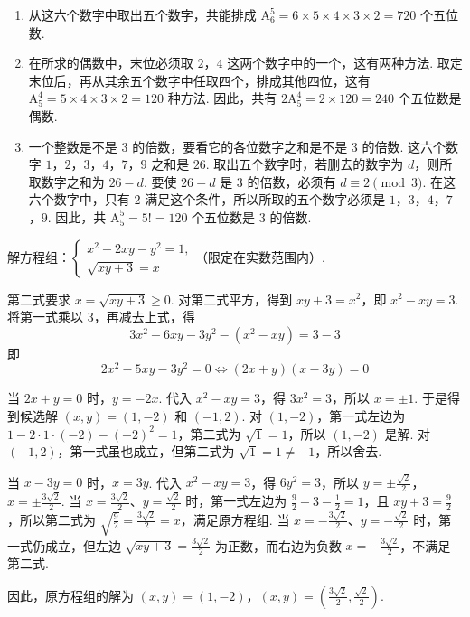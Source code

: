 \begin{solution}
\begin{enumerate}
\item 从这六个数字中取出五个数字，共能排成 \(\mathrm A_6^5=6\times5\times4\times3\times2=720\) 个五位数.

\item 在所求的偶数中，末位必须取 \(2\)，\(4\) 这两个数字中的一个，这有两种方法. 取定末位后，再从其余五个数字中任取四个，排成其他四位，这有 \(\mathrm A_5^4=5\times4\times3\times2=120\) 种方法. 因此，共有 \(2\mathrm A_5^4=2\times120=240\) 个五位数是偶数.

\item 一个整数是不是 \(3\) 的倍数，要看它的各位数字之和是不是 \(3\) 的倍数. 这六个数字 \(1\)，\(2\)，\(3\)，\(4\)，\(7\)，\(9\) 之和是 \(26\). 取出五个数字时，若删去的数字为 \(d\)，则所取数字之和为 \(26-d\). 要使 \(26-d\) 是 \(3\) 的倍数，必须有 \(d\equiv2\pmod3\). 在这六个数字中，只有 \(2\) 满足这个条件，所以所取的五个数字必须是 \(1\)，\(3\)，\(4\)，\(7\)，\(9\). 因此，共 \(\mathrm A_5^5=5!=120\) 个五位数是 \(3\) 的倍数.
\end{enumerate}
\end{solution}

\begin{problem}
解方程组：\(\begin{cases}
x^2-2xy-y^2=1,\\
\sqrt{xy+3}=x
\end{cases}\)（限定在实数范围内）.
\end{problem}

\begin{solution}
第二式要求 \(x=\sqrt{xy+3}\geq0\). 对第二式平方，得到
\(xy+3=x^2\)，即 \(x^2-xy=3\).
将第一式乘以 \(3\)，再减去上式，得
\[
3x^2-6xy-3y^2-(x^2-xy)=3-3
\]
即
\[
2x^2-5xy-3y^2=0
\Longleftrightarrow
\left(2x+y\right)\left(x-3y\right)=0
\]

当 \(2x+y=0\) 时，\(y=-2x\). 代入 \(x^2-xy=3\)，得
\(3x^2=3\)，所以 \(x=\pm1\).
于是得到候选解 \((x,y)=(1,-2)\) 和 \((-1,2)\). 对 \((1,-2)\)，第一式左边为 \(1-2\cdot1\cdot(-2)-(-2)^2=1\)，第二式为 \(\sqrt{1}=1\)，所以 \((1,-2)\) 是解. 对 \((-1,2)\)，第一式虽也成立，但第二式为 \(\sqrt{1}=1\neq-1\)，所以舍去.

当 \(x-3y=0\) 时，\(x=3y\). 代入 \(x^2-xy=3\)，得
\(6y^2=3\)，所以 \(y=\pm\frac{\sqrt2}{2}\)，\(x=\pm\frac{3\sqrt2}{2}\).
当 \(x=\frac{3\sqrt2}{2}\)、\(y=\frac{\sqrt2}{2}\) 时，第一式左边为 \(\frac92-3-\frac12=1\)，且 \(xy+3=\frac92\)，所以第二式为 \(\sqrt{\frac92}=\frac{3\sqrt2}{2}=x\)，满足原方程组. 当 \(x=-\frac{3\sqrt2}{2}\)、\(y=-\frac{\sqrt2}{2}\) 时，第一式仍成立，但左边 \(\sqrt{xy+3}=\frac{3\sqrt2}{2}\) 为正数，而右边为负数 \(x=-\frac{3\sqrt2}{2}\)，不满足第二式.

因此，原方程组的解为
\(\left(x,y\right)=\left(1,-2\right)\)，\(\left(x,y\right)=\left(\frac{3\sqrt2}{2},\frac{\sqrt2}{2}\right)\).
\end{solution}

